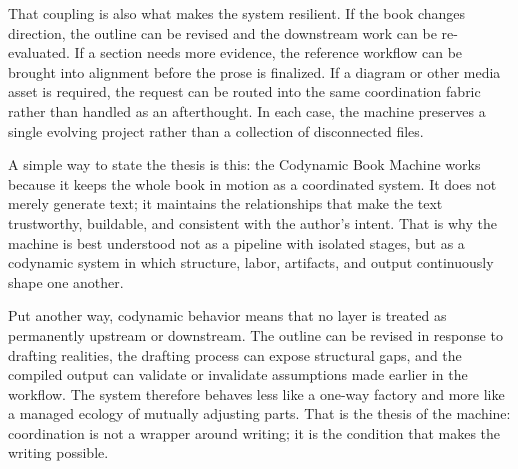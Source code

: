 \documentclass[11pt]{article}
\begin{document}
That coupling is also what makes the system resilient. If the book changes direction, the outline can be revised and the downstream work can be re-evaluated. If a section needs more evidence, the reference workflow can be brought into alignment before the prose is finalized. If a diagram or other media asset is required, the request can be routed into the same coordination fabric rather than handled as an afterthought. In each case, the machine preserves a single evolving project rather than a collection of disconnected files.

A simple way to state the thesis is this: the Codynamic Book Machine works because it keeps the whole book in motion as a coordinated system. It does not merely generate text; it maintains the relationships that make the text trustworthy, buildable, and consistent with the author's intent. That is why the machine is best understood not as a pipeline with isolated stages, but as a codynamic system in which structure, labor, artifacts, and output continuously shape one another.

Put another way, codynamic behavior means that no layer is treated as permanently upstream or downstream. The outline can be revised in response to drafting realities, the drafting process can expose structural gaps, and the compiled output can validate or invalidate assumptions made earlier in the workflow. The system therefore behaves less like a one-way factory and more like a managed ecology of mutually adjusting parts. That is the thesis of the machine: coordination is not a wrapper around writing; it is the condition that makes the writing possible.
\end{document}
